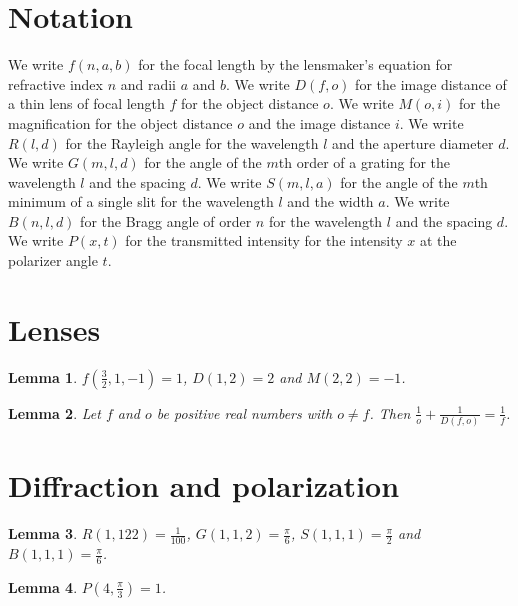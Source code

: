 \documentclass{article}
\newtheorem{lemma}{Lemma}
\begin{document}
\section{Notation}

We write $f(n,a,b)$ for the focal length by the lensmaker's equation for refractive index $n$ and radii $a$ and $b$.
We write $D(f,o)$ for the image distance of a thin lens of focal length $f$ for the object distance $o$.
We write $M(o,i)$ for the magnification for the object distance $o$ and the image distance $i$.
We write $R(l,d)$ for the Rayleigh angle for the wavelength $l$ and the aperture diameter $d$.
We write $G(m,l,d)$ for the angle of the $m$th order of a grating for the wavelength $l$ and the spacing $d$.
We write $S(m,l,a)$ for the angle of the $m$th minimum of a single slit for the wavelength $l$ and the width $a$.
We write $B(n,l,d)$ for the Bragg angle of order $n$ for the wavelength $l$ and the spacing $d$.
We write $P(x,t)$ for the transmitted intensity for the intensity $x$ at the polarizer angle $t$.

\section{Lenses}

\begin{lemma}\label{lens}
$f(\frac32,1,-1)=1$, $D(1,2)=2$ and $M(2,2)=-1$.
\end{lemma}

\begin{lemma}\label{thin}
Let $f$ and $o$ be positive real numbers with $o\ne f$. Then $\frac{1}{o}+\frac{1}{D(f,o)}=\frac{1}{f}$.
\end{lemma}

\section{Diffraction and polarization}

\begin{lemma}\label{diffraction}
$R(1,122)=\frac{1}{100}$, $G(1,1,2)=\frac{\pi}{6}$, $S(1,1,1)=\frac{\pi}{2}$ and $B(1,1,1)=\frac{\pi}{6}$.
\end{lemma}

\begin{lemma}\label{malus}
$P(4,\frac{\pi}{3})=1$.
\end{lemma}
\end{document}
